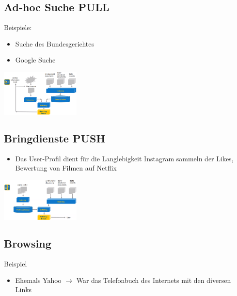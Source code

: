 \documentclass{report}
\newenvironment{Figure}
	{\par\medskip\noindent\minipage{\linewidth}}
	{\endminipage\par\medskip}
\theoremstyle{definition}
\theoremstyle{example}
\begin{document}
\subsection{Ad-hoc Suche PULL}
Beispiele:
\begin{itemize}
   \item Suche des Bundesgerichtes
   \item Google Suche
\end{itemize}

\begin{Figure}
   \centering
    \includegraphics[width=150px]{img/PullParadigma.png}
        \label{fig:Ablauf Ad-hoc Suche}
\end{Figure}

\subsection{Bringdienste PUSH}
\begin{itemize}
   \item Das User-Profil dient für die Langlebigkeit
   \subitem Instagram sammeln der Likes, Bewertung von Filmen auf Netflix 
\end{itemize}

\begin{Figure}
   \centering
    \includegraphics[width=150px]{img/PushParadigma.png}
        \label{fig:Ablauf Bringdienste}
\end{Figure}

\subsection{Browsing}
Beispiel
\begin{itemize}
   \item Ehemals Yahoo $\rightarrow$ War das Telefonbuch des Internets mit den diversen Links
\end{itemize}
\end{document}
